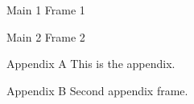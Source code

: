 \documentclass[aspectratio=169]{beamer}
\begin{document}
\begin{frame}{Main 1} Frame 1 \end{frame}
\begin{frame}{Main 2} Frame 2 \end{frame}

\appendix

\begin{frame}{Appendix A} This is the appendix. \end{frame}
\begin{frame}{Appendix B} Second appendix frame. \end{frame}
\end{document}
